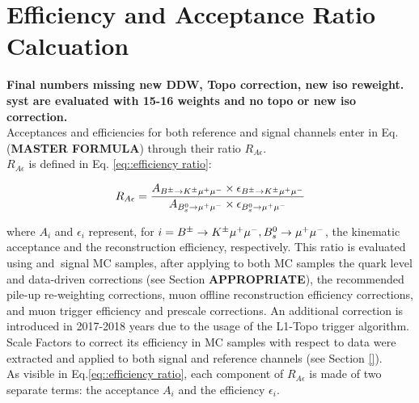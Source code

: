 \section{Efficiency and Acceptance Ratio Calcuation}
\label{sec:AccepEffRatio}

\textbf{Final numbers missing new DDW, Topo correction, new iso reweight.}\\

\textbf{syst are evaluated with 15-16 weights and no topo or new iso correction.}\\

\noindent
Acceptances and efficiencies for both reference and signal channels enter in Eq. (\textbf{MASTER FORMULA}) through their ratio $R_{A \epsilon}$.\\
$R_{A \epsilon}$ is defined in Eq. \ref{eq::efficiency ratio}:

\begin{equation}
    R_{A \epsilon}= \frac{A_{B^\pm \to K^\pm \mu^+\mu^-} \times \epsilon_{B^\pm \to K^\pm \mu^+\mu^-}}{A_{B_s^0 \to \mu^+\mu^-}\times \epsilon_{B_s^0 \to \mu^+\mu^-}}
    \label{eq::efficiency ratio}
\end{equation}

\noindent
where $A_i$ and $\epsilon_i$ represent, for $i=B^\pm \to K^\pm \mu^+\mu^- , B_s^0 \to \mu^+\mu^-$, the kinematic acceptance and the reconstruction efficiency, respectively.
This ratio is evaluated using \Bsmumu and \BpKpJpsi$\ $signal MC samples, after applying to both MC samples the quark level and data-driven corrections (see Section \textbf{APPROPRIATE}), the recommended pile-up re-weighting corrections, muon offline reconstruction efficiency corrections, and muon trigger efficiency and prescale corrections. 
An additional correction is introduced in 2017-2018 years due to the usage of the L1-Topo trigger algorithm.
Scale Factors to correct its efficiency in MC samples with respect to data were extracted and applied to both signal and reference channels (see Section \ref{}). \\

\noindent
As visible in Eq.\ref{eq::efficiency ratio}, each component of $R_{A \epsilon}$ is made of two separate terms:  the acceptance $A_i$ and the efficiency $\epsilon_i$. \\

